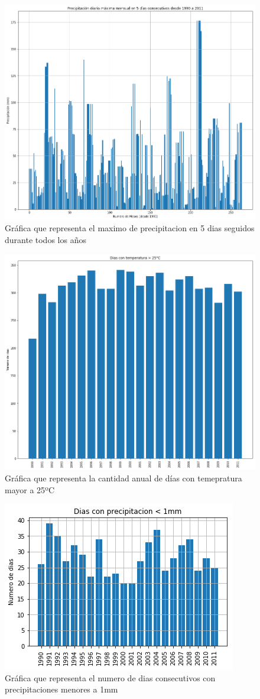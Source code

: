 \documentclass[12pt]{article}
\begin{document}
\begin{figure}
    \centering
    \includegraphics[scale=.3]{indice11.png}
    \caption{Gráfica que representa el maximo de precipitacion en 5 dias seguidos durante todos los años}
    \label{fig:indice11}
\end{figure}
\begin{figure}
    \centering
    \includegraphics[scale=.3]{indice2.png}
    \caption{Gráfica que representa la cantidad anual de días con temepratura mayor a 25ºC}
    \label{fig:indice2}
\end{figure}
\begin{figure}
    \centering
    \includegraphics[scale=.8]{indice15.png}
    \caption{Gráfica que representa el numero de dias consecutivos con precipitaciones menores a 1mm}
    \label{fig:indice15}
\end{figure}
\end{document}
